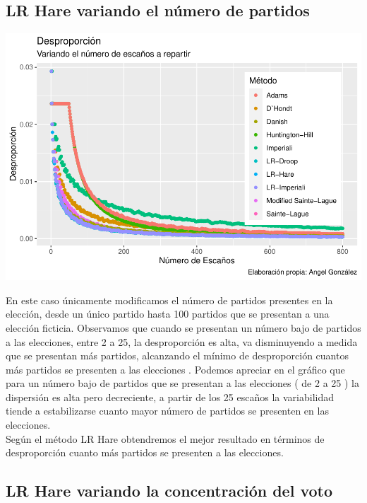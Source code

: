 \documentclass[12pt,a4paper,]{book}
\numberwithin{dummy}{section}
\theoremstyle{ocrenumbox}
\theoremstyle{blacknumex}
\theoremstyle{blacknumbox}
\theoremstyle{ocrenum}
\theoremstyle{ocrenum}
\begin{document}
\hypertarget{lr-hare-variando-el-nuxfamero-de-partidos}{%
\subsection{LR Hare variando el número de
partidos}\label{lr-hare-variando-el-nuxfamero-de-partidos}}

\begin{center}\includegraphics[width=0.95\linewidth]{figurasR/unnamed-chunk-54-1} \end{center}

En este caso únicamente modificamos el número de partidos presentes en
la elección, desde un único partido hasta 100 partidos que se presentan
a una elección ficticia. Observamos que cuando se presentan un número
bajo de partidos a las elecciones, entre 2 a 25, la desproporción es
alta, va disminuyendo a medida que se presentan más partidos, alcanzando
el mínimo de desproporción cuantos más partidos se presenten a las
elecciones . Podemos apreciar en el gráfico que para un número bajo de
partidos que se presentan a las elecciones ( de 2 a 25 ) la dispersión
es alta pero decreciente, a partir de los 25 escaños la variabilidad
tiende a estabilizarse cuanto mayor número de partidos se presenten en
las elecciones.\\
Según el método LR Hare obtendremos el mejor resultado en términos de
desproporción cuanto más partidos se presenten a las elecciones.

\hypertarget{lr-hare-variando-la-concentraciuxf3n-del-voto}{%
\subsection{LR Hare variando la concentración del
voto}\label{lr-hare-variando-la-concentraciuxf3n-del-voto}}
\end{document}
